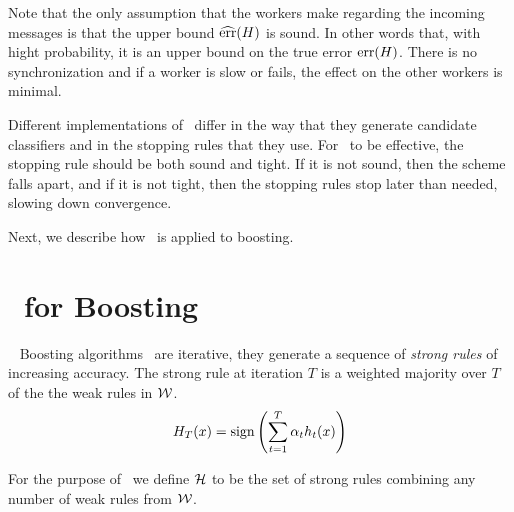 Note that the only assumption that the workers make regarding the
incoming messages is that the upper bound $\widehat{\mbox{err}}(H)$ is sound. In
other words that, with hight probability, it is an upper bound on the
true error $\mbox{err}(H)$. There is no synchronization and if a worker is
slow or fails, the effect on the other workers is minimal.

Different implementations of \tmsn\ differ in the way that they
generate candidate classifiers and in the stopping rules that they
use. For \tmsn\ to be effective, the stopping rule should be both
sound and tight. If it is not sound, then the scheme falls apart, and
if it is not tight, then the stopping rules stop later than needed,
slowing down convergence.

Next, we describe how \tmsn\ is applied to boosting.






\section{\tmsn\ for Boosting}~\label{sec:boost}
Boosting algorithms~\cite{schapire_boosting:_2012} are iterative, they generate a
sequence of {\em strong rules} of increasing accuracy. The strong rule
at iteration $T$ is a weighted majority over $T$ of the the weak rules
in $\mathcal{W}$.
$$H_T(x) = \mbox{sign} \left( \sum_{t=1}^T \alpha_t h_t(x) \right)$$

For the purpose of \tmsn\ we define ${\cal H}$ to be the set of
strong rules combining any number of weak rules from $\mathcal{W}$.

